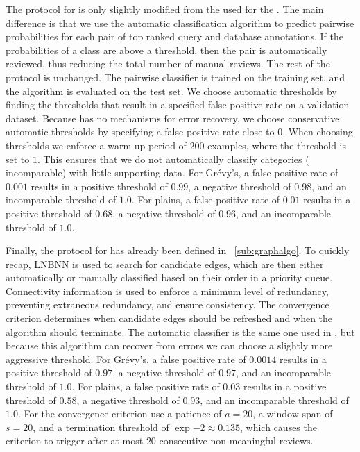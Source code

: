     The protocol for  is only slightly modified from the used for the .
    The main difference is that we use the automatic classification algorithm to predict pairwise probabilities
      for each pair of top ranked query and database annotations.
    If the probabilities of a class are above a threshold, then the pair is automatically reviewed, thus reducing
      the total number of manual reviews.
    The rest of the protocol is unchanged.
    The pairwise classifier is trained on the training set, and the algorithm is evaluated on the test set.
    We choose automatic thresholds by finding the thresholds that result in a specified false positive rate on a
      validation dataset.
    Because  has no mechanisms for error recovery, we choose conservative automatic thresholds by
      specifying a false positive rate close to $0$.
    When choosing thresholds we enforce a warm-up period of $200$ examples, where the threshold is set to $1$.
    This ensures that we do not automatically classify categories (\eg{} incomparable) with little supporting
      data.
    For Grévy's, a false positive rate of $0.001$ results in a positive threshold of $0.99$, a negative threshold
      of $0.98$, and an incomparable threshold of $1.0$.
    For plains, a false positive rate of $0.01$ results in a positive threshold of $0.68$, a negative threshold
      of $0.96$, and an incomparable threshold of $1.0$.


    Finally, the protocol for  has already been defined in ~\cref{sub:graphalgo}.
    To quickly recap, LNBNN is used to search for candidate edges, which are then either automatically or
      manually classified based on their order in a priority queue.
    Connectivity information is used to enforce a minimum level of redundancy, preventing extraneous redundancy,
      and ensure consistency.
    The convergence criterion determines when candidate edges should be refreshed and when the algorithm should
      terminate.
    The automatic classifier is the same one used in , but because this algorithm can recover from
      errors we can choose a slightly more aggressive threshold.
    For Grévy's, a false positive rate of $0.0014$ results in a positive threshold of $0.97$, a negative
      threshold of $0.97$, and an incomparable threshold of $1.0$.
    For plains, a false positive rate of $0.03$ results in a positive threshold of $0.58$, a negative threshold
      of $0.93$, and an incomparable threshold of $1.0$.
    For the convergence criterion use a patience of $a=20$, a window span of $s=20$, and a termination threshold
      of $\exp{-2}\approx0.135$, which causes the criterion to trigger after at most $20$ consecutive non-meaningful
      reviews.

